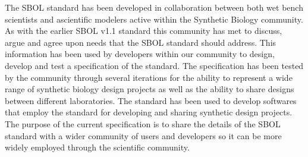 The SBOL standard has been developed in collaboration between both wet bench scientists and ascientific modelers active within the Synthetic Biology community. As with the earlier SBOL v1.1 standard this community has met to discuss, argue and agree upon needs that the SBOL standard should address. This information has been used by developers within our community to design, develop and test a specification of the standard. The specification has been tested by the community through several iterations for the ability to represent a wide range of synthetic biology design projects as well as the ability to share designs between different laboratories. The standard has been used to develop softwares that employ the standard for developing and sharing synthetic design projects. The purpose of the current specification is to share the details of the SBOL standard with a wider community of users and developers so it can be more widely employed through the scientific community.
\Rtodo{}
